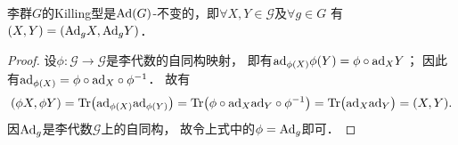 \begin{proposition}
    李群$G$的Killing型是${\rm Ad}(G)$-不变的，即$\forall X,Y \in \mathscr{G}$及$\forall g\in G$
    有$(X,Y)=({\rm Ad}_g X, {\rm Ad}_g Y )$．
\end{proposition}
\begin{proof}
    设$\phi:\mathscr{G}\to \mathscr{G}$是李代数的自同构映射，
    即有${\rm ad}_{\phi(X)} \phi(Y)= \phi\circ {\rm ad}_X Y$；
    因此有${\rm ad}_{\phi(X)} = \phi\circ {\rm ad}_X \circ \phi^{-1}$．    故有
    \begin{align*}
        (\phi X, \phi Y )= {\rm Tr}\bigl( {\rm ad}_{\phi(X)} {\rm ad}_{\phi(Y)}\bigr)
        ={\rm Tr}\bigl( \phi\circ {\rm ad}_X {\rm ad}_Y \circ \phi^{-1}\bigr)
        ={\rm Tr}\bigl( {\rm ad}_X {\rm ad}_Y \bigr) = (X,Y).
    \end{align*}  %
    因${\rm Ad}_g$是李代数$\mathscr{G}$上的自同构，
    故令上式中的$\phi={\rm Ad}_g$即可．
\end{proof}


